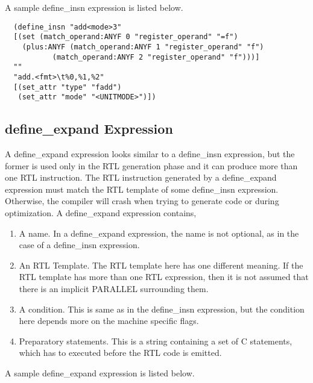 A sample define\_insn expression is listed below.

\begin{example}
\onehalfspacing
 \begin{verbatim}
  (define_insn "add<mode>3"
  [(set (match_operand:ANYF 0 "register_operand" "=f")
	(plus:ANYF (match_operand:ANYF 1 "register_operand" "f")
		   (match_operand:ANYF 2 "register_operand" "f")))]
  ""
  "add.<fmt>\t%0,%1,%2"
  [(set_attr "type" "fadd")
   (set_attr "mode" "<UNITMODE>")])
 \end{verbatim}

\end{example}


\subsection{define\_expand Expression}

A define\_expand expression looks similar to a define\_insn expression, but the former is used only in the RTL generation phase and it can produce 
more than one RTL instruction. The RTL instruction generated by a define\_expand expression must match the RTL template of some define\_insn expression.
Otherwise, the compiler will crash when trying to generate code or during optimization. A define\_expand expression contains,

\begin{enumerate}
 \item A name. In a define\_expand expression, the name is not optional, as in the case of a define\_insn expression.
 \item An RTL Template. The RTL template here has one different meaning. If the RTL template has more than one RTL expression, then it is not
 assumed that there is an implicit PARALLEL surrounding them.
 \item A condition. This is same as in the define\_insn expression, but the condition here depends more on the machine specific flags.
 \item Preparatory statements. This is a string containing a set of C statements, which has to executed before the RTL code is emitted.
\end{enumerate}

A sample define\_expand expression is listed below.

